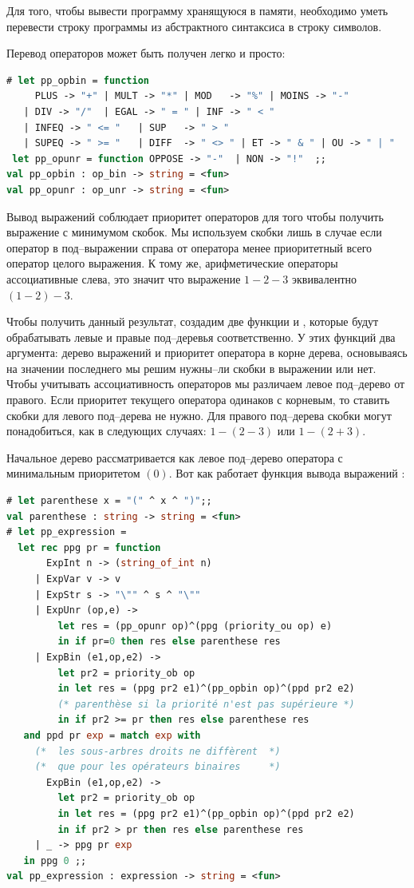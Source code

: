 Для того, чтобы вывести программу хранящуюся в памяти, необходимо уметь 
перевести строку программы из абстрактного синтаксиса в строку символов.

Перевод операторов может быть получен легко и просто:

\begin{lstlisting}[language=OCaml]
# let pp_opbin = function  
     PLUS -> "+" | MULT -> "*" | MOD   -> "%" | MOINS -> "-" 
   | DIV -> "/"  | EGAL -> " = " | INF -> " < " 
   | INFEQ -> " <= "   | SUP   -> " > " 
   | SUPEQ -> " >= "   | DIFF  -> " <> " | ET -> " & " | OU -> " | "  
 let pp_opunr = function OPPOSE -> "-"  | NON -> "!"  ;;
val pp_opbin : op_bin -> string = <fun>
val pp_opunr : op_unr -> string = <fun>
\end{lstlisting}

Вывод выражений соблюдает приоритет операторов для того чтобы получить выражение 
с минимумом скобок. Мы используем скобки лишь в случае если оператор в 
под--выражении справа от оператора менее приоритетный всего оператор целого 
выражения. К тому же, арифметические операторы ассоциативные слева, это значит 
что выражение $1 - 2 - 3$ эквивалентно $(1 - 2) - 3$.

Чтобы получить данный результат, создадим две функции  и , 
которые будут обрабатывать левые и правые под--деревья соответственно. У этих 
функций два аргумента: дерево выражений и приоритет оператора в корне дерева, 
основываясь на значении последнего мы решим нужны--ли скобки в выражении или 
нет. Чтобы учитывать ассоциативность операторов мы различаем левое под--дерево 
от правого. Если приоритет текущего оператора одинаков с корневым, то ставить 
скобки для левого под--дерева не нужно. Для правого под--дерева скобки могут 
понадобиться, как в следующих случаях: $1 - (2 - 3)$ или $1 - (2 + 3)$.

Начальное дерево рассматривается как левое под--дерево оператора с минимальным 
приоритетом $(0)$. Вот как работает функция вывода выражений 
:

\begin{lstlisting}[language=OCaml]
# let parenthese x = "(" ^ x ^ ")";;  
val parenthese : string -> string = <fun>
# let pp_expression = 
  let rec ppg pr = function 
       ExpInt n -> (string_of_int n)
     | ExpVar v -> v 
     | ExpStr s -> "\"" ^ s ^ "\"" 
     | ExpUnr (op,e) -> 
         let res = (pp_opunr op)^(ppg (priority_ou op) e) 
         in if pr=0 then res else parenthese res 
     | ExpBin (e1,op,e2) -> 
         let pr2 = priority_ob op
         in let res = (ppg pr2 e1)^(pp_opbin op)^(ppd pr2 e2)
         (* parenthèse si la priorité n'est pas supérieure *)
         in if pr2 >= pr then res else parenthese res
   and ppd pr exp = match exp with 
     (*  les sous-arbres droits ne diffèrent  *)
     (*  que pour les opérateurs binaires     *) 
       ExpBin (e1,op,e2) -> 
         let pr2 = priority_ob op
         in let res = (ppg pr2 e1)^(pp_opbin op)^(ppd pr2 e2)
         in if pr2 > pr then res else parenthese res
     | _ -> ppg pr exp
   in ppg 0 ;;
val pp_expression : expression -> string = <fun>
\end{lstlisting}

